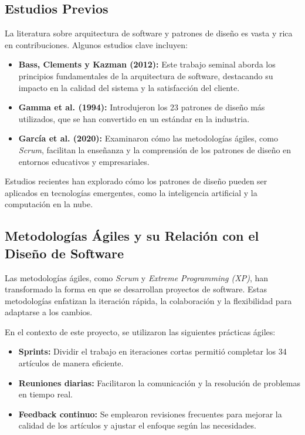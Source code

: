 \documentclass[12pt, a4paper, twocolumn]{article}
\begin{document}
\subsection{Estudios Previos}
La literatura sobre arquitectura de software y patrones de diseño es vasta y rica en contribuciones. Algunos estudios clave incluyen:
\begin{itemize}
    \item \textbf{Bass, Clements y Kazman (2012):} Este trabajo seminal aborda los principios fundamentales de la arquitectura de software, destacando su impacto en la calidad del sistema y la satisfacción del cliente.
    \item \textbf{Gamma et al. (1994):} Introdujeron los 23 patrones de diseño más utilizados, que se han convertido en un estándar en la industria.
    \item \textbf{García et al. (2020):} Examinaron cómo las metodologías ágiles, como \textit{Scrum}, facilitan la enseñanza y la comprensión de los patrones de diseño en entornos educativos y empresariales.
\end{itemize}

Estudios recientes han explorado cómo los patrones de diseño pueden ser aplicados en tecnologías emergentes, como la inteligencia artificial y la computación en la nube.

\subsection{Metodologías Ágiles y su Relación con el Diseño de Software}
Las metodologías ágiles, como \textit{Scrum} y \textit{Extreme Programming (XP)}, han transformado la forma en que se desarrollan proyectos de software. Estas metodologías enfatizan la iteración rápida, la colaboración y la flexibilidad para adaptarse a los cambios.

En el contexto de este proyecto, se utilizaron las siguientes prácticas ágiles:
\begin{itemize}
    \item \textbf{Sprints:} Dividir el trabajo en iteraciones cortas permitió completar los 34 artículos de manera eficiente.
    \item \textbf{Reuniones diarias:} Facilitaron la comunicación y la resolución de problemas en tiempo real.
    \item \textbf{Feedback continuo:} Se emplearon revisiones frecuentes para mejorar la calidad de los artículos y ajustar el enfoque según las necesidades.
\end{itemize}
\end{document}
